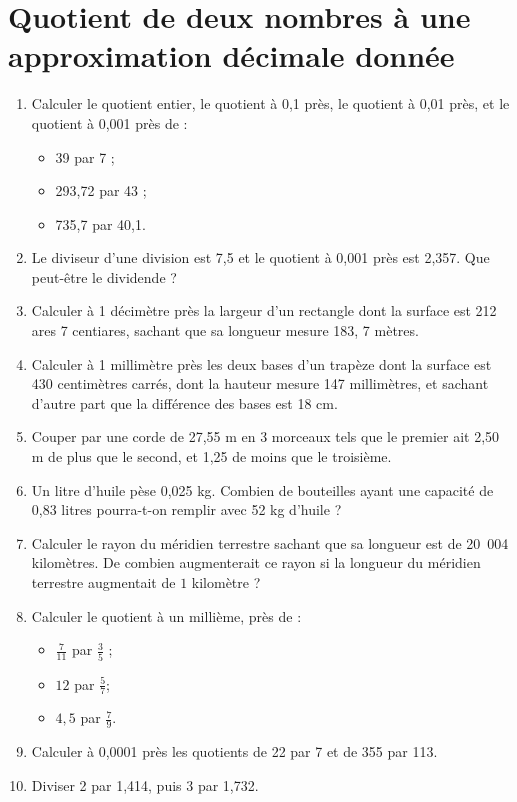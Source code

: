 
 \chapter{Quotient de deux nombres à une approximation décimale donnée}
 
 \begin{enumerate}
 \item Calculer le quotient entier, le quotient à 0,1 près, le quotient à 0,01 près, et le quotient à 0,001 près de : 
 \begin{itemize}
 \item 39 par 7 ;
 \item 293,72 par 43 ; 
 \item 735,7 par 40,1. 
 \end{itemize}
 \item Le diviseur d'une division est 7,5 et le quotient à 0,001 près est 2,357. Que peut-être le dividende ? 
 \item Calculer à 1 décimètre près la largeur d'un rectangle dont la surface est 212 ares 7 centiares, sachant que sa longueur mesure 183, 7 mètres. 
 \item Calculer à 1 millimètre près les deux bases d'un trapèze dont la surface est 430 centimètres carrés, dont la hauteur mesure 147 millimètres, et sachant d'autre part que la différence des bases est 18 cm. 
 \item Couper par une corde de 27,55 m en 3 morceaux tels que le premier ait 2,50 m de plus que le second, et 1,25 de moins que le troisième.
 \item Un litre d'huile pèse 0,025 kg. Combien de bouteilles ayant une capacité de 0,83 litres pourra-t-on remplir avec 52 kg d'huile ? 
 \item Calculer le rayon du méridien terrestre sachant que sa longueur est de 20~004 kilomètres. De combien augmenterait ce rayon si la longueur du méridien terrestre augmentait de $1$ kilomètre ? 
 \item Calculer le quotient à un millième, près de : 
 \begin{itemize}
 \item $\frac7{11}$ par $\frac35$ ; 
 \item $12$ par $\frac57$; 
 \item $4,5$ par $\frac79$. 
 \end{itemize}
\item Calculer à 0,0001 près les quotients de 22 par 7 et de 355 par 113. 
\item Diviser 2 par 1,414, puis 3 par 1,732. 

\end{enumerate}
